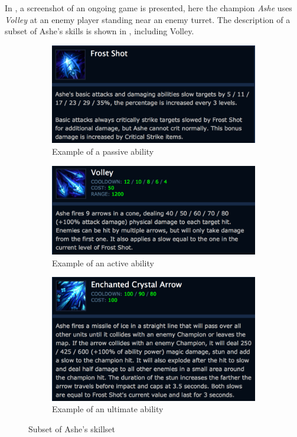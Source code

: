 In , a screenshot of an ongoing game is presented, here the champion \emph{Ashe} uses \emph{Volley} at an enemy player standing near an enemy turret. The description of a subset of Ashe's skills is shown in , including Volley.

\begin{figure}[!htb]
  \centering
  \begin{subfigure}[b]{0.49\textwidth}
    \includegraphics[width=\textwidth]{img/frostshot.png}
    \caption{Example of a passive ability}\label{fig:frostshot}
  \end{subfigure}
  \begin{subfigure}[b]{0.49\textwidth}
    \includegraphics[width=\textwidth]{img/volley.png}
    \caption{Example of an active ability}\label{fig:volley}
  \end{subfigure}
  \begin{subfigure}[b]{0.49\textwidth}
    \includegraphics[width=\textwidth]{img/enchanted.png}
    \caption{Example of an ultimate ability}\label{fig:enchanted}
  \end{subfigure}
  \caption{Subset of Ashe's skillset~\cite{ashe}}\label{fig:ashe}
\end{figure}

